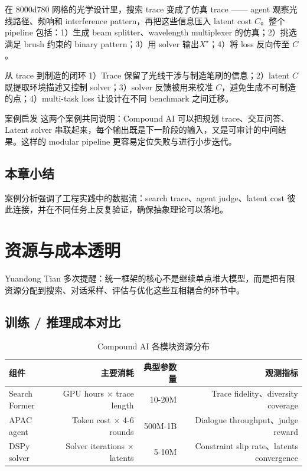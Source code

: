 \documentclass[a4paper]{article}
\begin{document}
在 80\u00d780 网格的光学设计里，搜索 trace 变成了仿真 trace —— agent 观察光线路径、频响和 interference pattern，再把这些信息压入 latent cost \(C\)。整个 pipeline 包括：1）生成 beam splitter、wavelength multiplexer 的仿真；2）挑选满足 brush 约束的 binary pattern；3）用 solver 输出\(X^\star\)；4）将 loss 反向传至 \(C\)。
\begin{importantbox}{从 trace 到制造的闭环}
1）Trace 保留了光线干涉与制造笔刷的信息；2）latent \(C\) 既提取环境描述又控制 solver；3）solver 反馈被用来校准 \(C\)，避免生成不可制造的点；4）multi-task loss 让设计在不同 benchmark 之间迁移。
\end{importantbox}
\begin{knowledgebox}{案例启发}
这两个案例共同说明：Compound AI 可以把规划 trace、交互问答、Latent solver 串联起来，每个输出既是下一阶段的输入，又是可审计的中间结果。这样的 modular pipeline 更容易定位失败与进行小步迭代。
\end{knowledgebox}

\subsection{本章小结}

案例分析强调了工程实践中的数据流：search trace、agent judge、latent cost 彼此连接，并在不同任务上反复验证，确保抽象理论可以落地。

\section{资源与成本透明}

Yuandong Tian 多次提醒：统一框架的核心不是继续单点堆大模型，而是把有限资源分配到搜索、对话采样、评估与优化这些互相耦合的环节中。

\subsection{训练 / 推理成本对比}

\begin{table}[H]
\centering
\begin{tabular}{lrrr}
\toprule
组件 & 主要消耗 & 典型参数量 & 观测指标 \\
\midrule
Search Former & GPU hours × trace length & 10-20M & Trace fidelity、diversity coverage \\
APAC agent & Token cost × 4-6 rounds & 500M-1B & Dialogue throughput、judge reward \\
DSPy solver & Solver iterations × latents & 5-10M & Constraint slip rate、latents convergence \\
\bottomrule
\end{tabular}
\caption{Compound AI 各模块资源分布}
\end{table}
\end{document}
